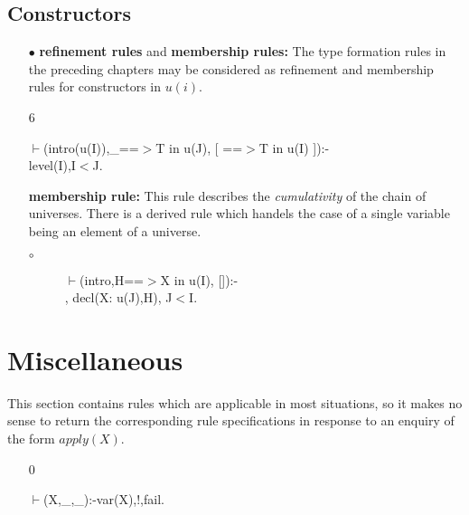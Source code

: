 \documentclass[11pt]{report}
\begin{document}
 \subsection{Constructors}
 \begin{enumerate}
 \item[$\bullet$]
 {\bf refinement rules} and {\bf membership rules:}
 The type formation rules in the preceding chapters may be
 considered as refinement and membership rules for constructors 
 in $u(i)$.
  
 \item[6]
\begin{sf}\begin{tabbing}
$\vdash$(intro(u(I)),\_\hspace{0.1em}==$>$T in u(J), [ ==$>$T in u(I) ]):-\\[-0.15ex]
\hspace{2em}level(I),I$<$J.
\end{tabbing}\end{sf}

 {\bf membership rule:}
 This rule describes the \emph{cumulativity} of the chain of universes.
 There is a derived rule which handels the case of a single
 variable being an element of a universe.
 \begin{description}
 \item[$\circ$] 
\begin{sf}\begin{tabbing}
$\vdash$(intro,H==$>$X in u(I), []):-\\[-0.15ex]
\hspace{2em}{\bf derived}, decl(X: u(J),H), J$<$I.
\end{tabbing}\end{sf}

 \end{description}
 \end{enumerate}
  
  
 \section{Miscellaneous}
 This section contains rules which are applicable in most situations,
 so it makes no sense to return the corresponding rule specifications
 in response to an enquiry of the form $apply(X)$.
 \begin{enumerate}
 \item[0]
\begin{sf}\begin{tabbing}
$\vdash$(X,\_\hspace{0.1em},\_\hspace{0.1em}):-var(X),!,fail.
\end{tabbing}\end{sf}

 \end{enumerate}
  
\end{document}
